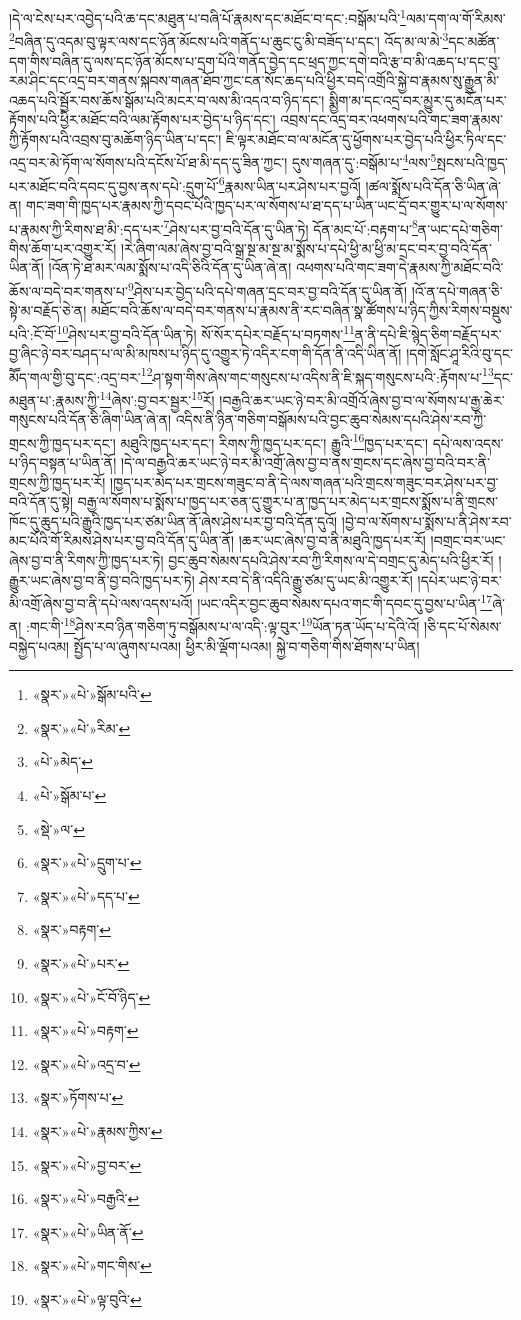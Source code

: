 །དེ་ལ་ངེས་པར་འབྱེད་པའི་ཆ་དང་མཐུན་པ་བཞི་པོ་རྣམས་དང་མཐོང་བ་དང་:བསྒོམ་པའི་\footnote{«སྣར་»«པེ་»སྒོམ་པའི་}ལམ་དག་ལ་གོ་རིམས་\footnote{«སྣར་»«པེ་»རིམ་}བཞིན་དུ་འདམ་བུ་ལྟར་ལས་དང་ཉོན་མོངས་པའི་གནོད་པ་ཆུང་ངུ་མི་བཟོད་པ་དང་། འོད་མ་ལ་མེ་\footnote{«པེ་»མེད་}དང་མཚོན་དག་གིས་བཞིན་དུ་ལས་དང་ཉོན་མོངས་པ་དྲག་པོའི་གནོད་བྱེད་དང་ཕྲད་ཀྱང་དགེ་བའི་རྩ་བ་མི་འཆད་པ་དང་བུ་རམ་ཤིང་དང་འདྲ་བར་གནས་སྐབས་གཞན་ཐོབ་ཀྱང་ངན་སོང་ཆད་པའི་ཕྱིར་བདེ་འགྲོའི་སྐྱེ་བ་རྣམས་སུ་རྒྱུན་མི་འཆད་པའི་སྦྱོར་བས་ཆོས་སྒོམ་པའི་མངར་བ་ལས་མི་འདའ་བ་ཉིད་དང་། སྨྱིག་མ་དང་འདྲ་བར་མྱུར་དུ་མངོན་པར་རྟོགས་པའི་ཕྱིར་མཐོང་བའི་ལམ་རྟོགས་པར་བྱེད་པ་ཉིད་དང་། འབྲས་དང་འདྲ་བར་འཕགས་པའི་གང་ཟག་རྣམས་ཀྱི་རྟོགས་པའི་འབྲས་བུ་མཆོག་ཉིད་ཡིན་པ་དང་། ཇི་ལྟར་མཐོང་བ་ལ་མངོན་དུ་ཕྱོགས་པར་བྱེད་པའི་ཕྱིར་ཏིལ་དང་འདྲ་བར་མེ་ཏོག་ལ་སོགས་པའི་དངོས་པོ་ཐ་མི་དད་དུ་ཟིན་ཀྱང་། དུས་གཞན་དུ་:བསྒོམ་པ་\footnote{«པེ་»སྒོམ་པ་}ལས་\footnote{«སྡེ་»ལ་}སྤངས་པའི་ཁྱད་པར་མཐོང་བའི་དབང་དུ་བྱས་ནས་དཔེ་:དྲུག་པོ་\footnote{«སྣར་»«པེ་»དྲུག་པ་}རྣམས་ཡིན་པར་ཤེས་པར་བྱའོ། །ཚལ་སྨོས་པའི་དོན་ཅི་ཡིན་ཞེ་ན། གང་ཟག་གི་ཁྱད་པར་རྣམས་ཀྱི་དབང་པོའི་ཁྱད་པར་ལ་སོགས་པ་ཐ་དད་པ་ཡིན་ཡང་དྲོ་བར་གྱུར་པ་ལ་སོགས་པ་རྣམས་ཀྱི་རིགས་ཐ་མི་:དད་པར་\footnote{«སྣར་»«པེ་»དད་པ་}ཤེས་པར་བྱ་བའི་དོན་དུ་ཡིན་ཏེ། དོན་མང་པོ་:བརྟག་པ་\footnote{«སྣར་»བརྟག་}ན་ཡང་དཔེ་གཅིག་གིས་ཆོག་པར་འགྱུར་རོ། །རེ་ཞིག་ལམ་ཞེས་བྱ་བའི་སྒྲ་སྔ་མ་སྔ་མ་སྨོས་པ་དཔེ་ཕྱི་མ་ཕྱི་མ་དྲང་བར་བྱ་བའི་དོན་ཡིན་ནོ། །འོན་ཏེ་ཐ་མར་ལམ་སྨོས་པ་འདི་ཅིའི་དོན་དུ་ཡིན་ཞེ་ན། འཕགས་པའི་གང་ཟག་དེ་རྣམས་ཀྱི་མཐོང་བའི་ཆོས་ལ་བདེ་བར་གནས་པ་\footnote{«སྣར་»«པེ་»པར་}ཤེས་པར་བྱེད་པའི་དཔེ་གཞན་དྲང་བར་བྱ་བའི་དོན་དུ་ཡིན་ནོ། །འོ་ན་དཔེ་གཞན་ཅི་སྟེ་མ་བརྗོད་ཅེ་ན། མཐོང་བའི་ཆོས་ལ་བདེ་བར་གནས་པ་རྣམས་ནི་རང་བཞིན་སྣ་ཚོགས་པ་ཉིད་ཀྱིས་རིགས་བསྡུས་པའི་:ངོ་བོ་\footnote{«སྣར་»«པེ་»ངོ་བོ་ཉིད་}ཤེས་པར་བྱ་བའི་དོན་ཡིན་ཏེ། སོ་སོར་དཔེར་བརྗོད་པ་བཏགས་\footnote{«སྣར་»«པེ་»བརྟག་}ན་ནི་དཔེ་ཇི་སྙེད་ཅིག་བརྗོད་པར་བྱ་ཞིང་ཉེ་བར་བཤད་པ་ལ་མི་མཁས་པ་ཉིད་དུ་འགྱུར་ཏེ་འདིར་ངག་གི་དོན་ནི་འདི་ཡིན་ནོ། །དགེ་སློང་ཤཱ་རིའི་བུ་དང་མཽད་གལ་གྱི་བུ་དང་:འདྲ་བར་\footnote{«སྣར་»«པེ་»འདྲ་བ་}ཤ་སྟག་གིས་ཞེས་གང་གསུངས་པ་འདིས་ནི་ཇི་སྐད་གསུངས་པའི་:རྟོགས་པ་\footnote{«སྣར་»ཏོགས་པ་}དང་མཐུན་པ་:རྣམས་ཀྱི་\footnote{«སྣར་»«པེ་»རྣམས་ཀྱིས་}ཞེས་:བྱ་བར་སྦྱར་\footnote{«སྣར་»«པེ་»བྱ་བར་}རོ། །བརྒྱའི་ཆར་ཡང་ཉེ་བར་མི་འགྲོའོ་ཞེས་བྱ་བ་ལ་སོགས་པ་རྒྱ་ཆེར་གསུངས་པའི་དོན་ཅི་ཞིག་ཡིན་ཞེ་ན། འདིས་ནི་ཉིན་གཅིག་བསྒོམས་པའི་བྱང་ཆུབ་སེམས་དཔའི་ཤེས་རབ་ཀྱི་གྲངས་ཀྱི་ཁྱད་པར་དང་། མཐུའི་ཁྱད་པར་དང་། རིགས་ཀྱི་ཁྱད་པར་དང་། རྒྱུའི་\footnote{«སྣར་»«པེ་»བརྒྱའི་}ཁྱད་པར་དང་། དཔེ་ལས་འདས་པ་ཉིད་བསྟན་པ་ཡིན་ནོ། །དེ་ལ་བརྒྱའི་ཆར་ཡང་ཉེ་བར་མི་འགྲོ་ཞེས་བྱ་བ་ནས་གྲངས་དང་ཞེས་བྱ་བའི་བར་ནི་གྲངས་ཀྱི་ཁྱད་པར་རོ། །ཁྱད་པར་མེད་པར་གྲངས་གཟུང་བ་ནི་དེ་ལས་གཞན་པའི་གྲངས་གཟུང་བར་ཤེས་པར་བྱ་བའི་དོན་དུ་སྟེ། བརྒྱ་ལ་སོགས་པ་སྨོས་པ་ཁྱད་པར་ཅན་དུ་གྱུར་པ་ན་ཁྱད་པར་མེད་པར་གྲངས་སྨོས་པ་ནི་གྲངས་ཁོང་དུ་ཆུད་པའི་རྒྱུའི་ཁྱད་པར་ཙམ་ཡིན་ནོ་ཞེས་ཤེས་པར་བྱ་བའི་དོན་དུའོ། །བྱེ་བ་ལ་སོགས་པ་སྨོས་པ་ནི་ཤེས་རབ་མང་པོའི་གོ་རིམས་ཤེས་པར་བྱ་བའི་དོན་དུ་ཡིན་ནོ། །ཆར་ཡང་ཞེས་བྱ་བ་ནི་མཐུའི་ཁྱད་པར་རོ། །བགྲང་བར་ཡང་ཞེས་བྱ་བ་ནི་རིགས་ཀྱི་ཁྱད་པར་ཏེ། བྱང་ཆུབ་སེམས་དཔའི་ཤེས་རབ་ཀྱི་རིགས་ལ་དེ་བགྲང་དུ་མེད་པའི་ཕྱིར་རོ། །རྒྱུར་ཡང་ཞེས་བྱ་བ་ནི་བྱ་བའི་ཁྱད་པར་ཏེ། ཤེས་རབ་དེ་ནི་འདིའི་རྒྱུ་ཙམ་དུ་ཡང་མི་འགྱུར་རོ། །དཔེར་ཡང་ཉེ་བར་མི་འགྲོ་ཞེས་བྱ་བ་ནི་དཔེ་ལས་འདས་པའོ། །ཡང་འདིར་བྱང་ཆུབ་སེམས་དཔའ་གང་གི་དབང་དུ་བྱས་པ་ཡིན་\footnote{«སྣར་»«པེ་»ཡིན་ནོ་}ཞེ་ན། :གང་གི་\footnote{«སྣར་»«པེ་»གང་གིས་}ཤེས་རབ་ཉིན་གཅིག་ཏུ་བསྒོམས་པ་ལ་འདི་:ལྟ་བུར་\footnote{«སྣར་»«པེ་»ལྟ་བུའི་}ཡོན་ཏན་ཡོད་པ་དེའི་འོ། །ཅི་དང་པོ་སེམས་བསྐྱེད་པའམ། སྤྱོད་པ་ལ་ཞུགས་པའམ། ཕྱིར་མི་ལྡོག་པའམ། སྐྱེ་བ་གཅིག་གིས་ཐོགས་པ་ཡིན། 